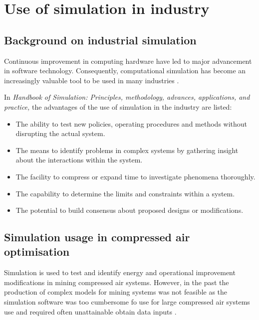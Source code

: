 \section{Use of simulation in industry }
	\subsection{Background on industrial simulation}
	
		Continuous improvement in computing hardware have led to major advancement in software technology. Consequently, computational simulation has become an increasingly valuable tool to be used in many industries \cite{kocsis2003integration}.
		\par 
		In \textit{ Handbook of Simulation: Principles, methodology, advances, applications, and practice,} \cite{banks1998handbook} the advantages of the use of simulation in the industry are listed: %
		\begin{itemize}
			\item The ability to test new policies, operating procedures and methods without disrupting the actual system.
			\item The means to identify problems in complex systems by gathering insight about the interactions within the system.
			\item The facility to compress or expand time to investigate phenomena thoroughly.
			\item The capability to determine the limits and constraints within a system.
			\item The potential to build consensus about proposed designs or modifications.
		\end{itemize}

	\subsection{Simulation usage in compressed air optimisation}
		Simulation is used to test and identify energy and operational improvement modifications in mining compressed air systems. However, in the past  the production of complex models for mining systems was not feasible as the simulation software was too cumbersome fo use for large compressed air systems use and required often unattainable obtain data inputs \cite{marais2013simplification}. 
		\par 
